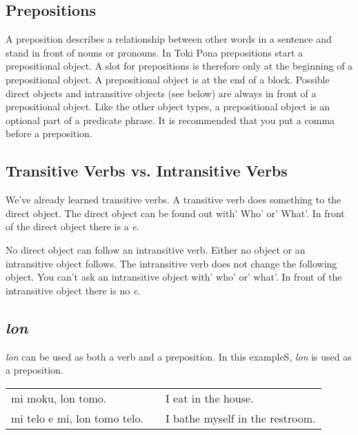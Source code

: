 %
\subsection*{Prepositions}
%
A preposition describes a relationship between other words in a sentence and stand in front of nouns or pronouns. 
In Toki Pona prepositions start a prepositional object. 
A slot for prepositions is therefore only at the beginning of a prepositional object. 
A prepositional object is at the end of a block. 
Possible direct objects and intransitive objects (see below) are always in front of a prepositional object.
Like the other object types, a prepositional object is an optional part of a predicate phrase. 
It is recommended that you put a comma before a preposition.
%
\subsection*{Transitive Verbs vs. Intransitive Verbs}
%
We've already learned transitive verbs. 
A transitive verb does something to the direct object. 
The direct object can be found out with' Who' or' What'. 
In front of the direct object there is a \textit{e}.

No direct object can follow an intransitive verb. 
Either no object or an intransitive object follows. 
The intransitive verb does not change the following object. 
You can't ask an intransitive object with' who' or' what'.
In front of the intransitive object there is no \textit{e}.
%
\subsection*{\textit{lon}}
%
\textit{lon} can be used as both a verb and a preposition. 
In this exampleS, \textit{lon} is used as a preposition.

\begin{supertabular}{p{5,5cm}|ll}
mi moku, lon tomo. && I eat in the house. \\
mi telo e mi, lon tomo telo. && I bathe myself in the restroom. \\
\end{supertabular} 

